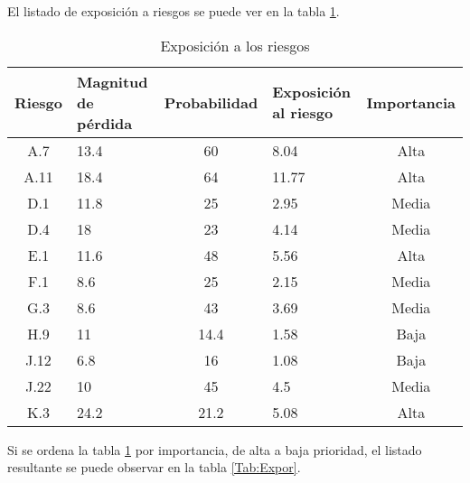 \documentclass[11pt,a4paper,spanish,twoside]{book}
\begin{document}
El listado de exposición a riesgos se puede ver en la tabla \ref{Tab:Expri}.

\begin{table}[!h]
  \centering
  \begin{tabular}{|c|b{2.1cm}<{\centering}|c|b{2cm}<{\centering}|c|}
    \hline
    \textbf{Riesgo} & \textbf{Magnitud de pérdida} & \textbf{Probabilidad} & 
    \textbf{Exposición al riesgo} & \textbf{Importancia} \\
    \hline \hline
    A.7  & 13.4 & 60   & 8.04  & Alta  \\ \hline
    A.11 & 18.4 & 64   & 11.77 & Alta  \\ \hline 
    D.1  & 11.8 & 25   & 2.95  & Media \\ \hline
    D.4  & 18   & 23   & 4.14  & Media \\ \hline
    E.1  & 11.6 & 48   & 5.56  & Alta  \\ \hline
    F.1  & 8.6  & 25   & 2.15  & Media \\ \hline
    G.3  & 8.6  & 43   & 3.69  & Media \\ \hline
    H.9  & 11   & 14.4 & 1.58  & Baja  \\ \hline
    J.12 & 6.8  & 16   & 1.08  & Baja  \\ \hline
    J.22 & 10   & 45   & 4.5   & Media \\ \hline
    K.3  & 24.2 & 21.2 & 5.08  & Alta  \\ \hline
  \end{tabular}
  \caption{Exposición a los riesgos} 
  \label{Tab:Expri}
\end{table}

Si se ordena la tabla \ref{Tab:Expri} por importancia, de alta a
baja prioridad, el listado resultante se puede observar en la tabla
\ref{Tab:Expor}.
\end{document}
